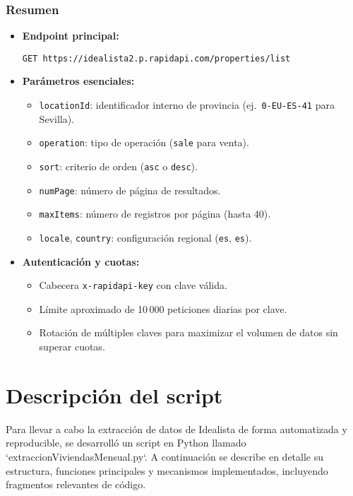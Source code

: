 \documentclass[a4paper,11pt]{book}
\begin{document}
\subsubsection{Resumen}
\begin{itemize}
  \item \textbf{Endpoint principal:}
  \begin{verbatim}
GET https://idealista2.p.rapidapi.com/properties/list
  \end{verbatim}
  \item \textbf{Parámetros esenciales:}
    \begin{itemize}
      \item \texttt{locationId}: identificador interno de provincia (ej.\ \texttt{0-EU-ES-41} para Sevilla).
      \item \texttt{operation}: tipo de operación (\texttt{sale} para venta).
      \item \texttt{sort}: criterio de orden (\texttt{asc} o \texttt{desc}).
      \item \texttt{numPage}: número de página de resultados.
      \item \texttt{maxItems}: número de registros por página (hasta 40).
      \item \texttt{locale}, \texttt{country}: configuración regional (\texttt{es}, \texttt{es}).
    \end{itemize}
  \item \textbf{Autenticación y cuotas:}
    \begin{itemize}
      \item Cabecera \texttt{x-rapidapi-key} con clave válida.
      \item Límite aproximado de 10\,000 peticiones diarias por clave.
      \item Rotación de múltiples claves para maximizar el volumen de datos sin superar cuotas.
    \end{itemize}
\end{itemize}


\section{Descripción del script}

Para llevar a cabo la extracción de datos de Idealista de forma automatizada y reproducible, se desarrolló un script en Python llamado `extraccionViviendasMensual.py`. A continuación se describe en detalle su estructura, funciones principales y mecanismos implementados, incluyendo fragmentos relevantes de código.
\end{document}
